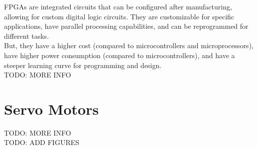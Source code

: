 \glspl{FPGA} are integrated circuits that can be configured after manufacturing, allowing for custom digital logic circuits. 
They are customizable for specific applications, have parallel processing capabilities, and can be reprogrammed for different tasks.\\
But, they have a higher cost (compared to microcontrollers and microprocessors), have higher power consumption (compared to microcontrollers), and have a steeper learning curve for programming and design.\\

TODO: MORE INFO

\section{Servo Motors}
TODO: MORE INFO\\
TODO: ADD FIGURES\\
